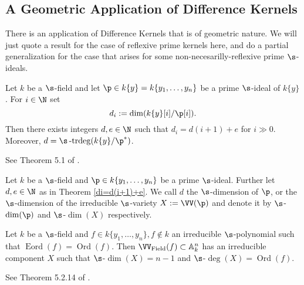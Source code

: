 \subsection{A Geometric Application of Difference Kernels}

There is an application of Difference Kernels that is of geometric nature. We will just quote a result for the case of reflexive prime kernels here,
and do a partial generalization for the case that arises for some non-necesarilly-reflexive prime $\s$-ideals.

\begin{theorem}\label{di=d(i+1)+e}
Let $k$ be a $\s$-field and let $\p \in k\{y\} = k\{y_1,\ldots,y_n\}$ be a prime $\s$-ideal of $k\{y\}$. For $i \in \N$ set $$d_i := \dim(k\{y\}[i]/\p[i]).$$
Then there exists integers $d, e \in \N$ such that $d_i = d(i+1) + e$ for $i \gg 0$. Moreover, $d = \s\operatorname{-trdeg}(k\{y\}/\p^*)$.
\begin{bew}
See Theorem 5.1 of \cite{wibmer}.
\end{bew}
\end{theorem}

\begin{defn}
Let $k$ be a $\s$-field and $\p \in k\{y_1,\ldots,y_n\}$ be a prime $\s$-ideal. Further let $d, e \in \N$ as in Theorem \ref{di=d(i+1)+e}. We call $d$ the $\s$-dimension of $\p$, 
or the $\s$-dimension of the irreducible $\s$-variety $X:= \VV(\p)$ and denote it by $\s$-$\dim(\p)$ and $\s$-$\dim(X)$ respectively.
\end{defn}

\begin{theorem}\label{irredcomp}
Let $k$ be a $\s$-field and $f \in k\{y_1,\ldots,y_n\}, f \notin k$ an irreducible $\s$-polynomial such that $\operatorname{Eord}(f) = \operatorname{Ord}(f)$. Then $\VV_{\operatorname{Field}}(f) \subset \mathbb{A}_k^n$ has an irreducible component $X$ such that $\s$-$\dim(X) = n-1$ and $\s$-$\operatorname{deg}(X) = \operatorname{Ord}(f)$.
\begin{bew}
See Theorem 5.2.14 of \cite{wibmer}.
\end{bew}
\end{theorem}

